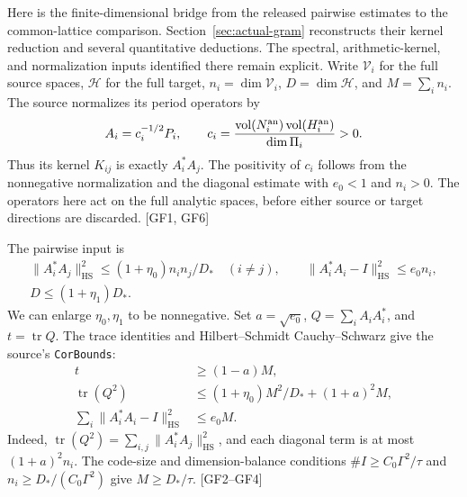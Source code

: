 \documentclass[11pt,a4paper]{article}
\numberwithin{equation}{section}
\theoremstyle{remark}\newtheorem{remark}[theorem]{Remark}
\newcommand{\HS}{\mathrm{HS}}
\newcommand{\tr}{\operatorname{tr}}
\begin{document}
Here is the finite-dimensional bridge from the released pairwise estimates to
the common-lattice comparison.  Section~\ref{sec:actual-gram} reconstructs their kernel reduction and several quantitative deductions. The spectral, arithmetic-kernel, and normalization inputs identified there remain explicit.  Write $\mathcal V_i$ for the full source spaces, $\mathcal H$ for the
full target, $n_i=\dim\mathcal V_i$, $D=\dim\mathcal H$, and $M=\sum_i n_i$.
The source normalizes its period operators by
\[
A_i=c_i^{-1/2}P_i,\qquad
c_i=\frac{\operatorname{vol}(N_i^{\rm an})
                  \operatorname{vol}(H_i^{\rm an})}{\dim\Pi_i}>0.
\]
Thus its kernel $K_{ij}$ is exactly $A_i^*A_j$.
The positivity of $c_i$ follows from the nonnegative normalization and the
diagonal estimate with $e_0<1$ and $n_i>0$.  The operators here act on the full
analytic spaces, before either source or target directions are discarded.
\textsf{[GF1, GF6]}

The pairwise input is
\begin{gather*}
\|A_i^*A_j\|_{\HS}^2\le(1+\eta_0)n_in_j/D_*\quad(i\ne j),\qquad
\|A_i^*A_i-I\|_{\HS}^2\le e_0n_i,\\
D\le(1+\eta_1)D_*.
\end{gather*}
We can enlarge $\eta_0,\eta_1$ to be nonnegative.  Set $a=\sqrt{e_0}$,
$Q=\sum_iA_iA_i^*$, and $t=\tr Q$.  The trace identities and
Hilbert--Schmidt Cauchy--Schwarz give the source's \texttt{CorBounds}:
\begin{equation}\label{eq:full-cor-bounds}
\begin{split}
t&\ge(1-a)M,\\
\tr(Q^2)&\le(1+\eta_0)M^2/D_*+(1+a)^2M,\\
\sum_i\|A_i^*A_i-I\|_{\HS}^2&\le e_0M.
\end{split}
\end{equation}
Indeed, $\tr(Q^2)=\sum_{i,j}\|A_i^*A_j\|_{\HS}^2$, and each diagonal
term is at most $(1+a)^2n_i$.  The code-size and dimension-balance conditions
$\#I\ge C_0\Gamma^2/\tau$ and
$n_i\ge D_*/(C_0\Gamma^2)$ give $M\ge D_*/\tau$.
\textsf{[GF2--GF4]}
\end{document}
